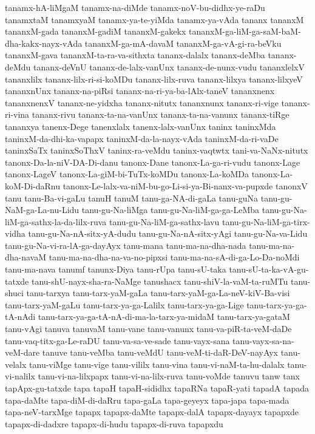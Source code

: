 {tanamx-hA-liMgaM
tanamx-na-diMde
tanamx-noV-bu-didhx-ye-raDu
tanamxtaM
tanamxyaM
tanamx-ya-te-yiMda
tanamx-ya-vAda
tananx
tananxM
tananxM-gada
tananxM-gadiM
tananxM-gakekx
tananxM-ga-liM-ga-saM-baM-dha-kakx-nayx-vAda
tananxM-ga-mA-davaM
tananxM-ga-vA-gi-ra-beVku
tananxM-gava
tananxM-ta-ra-va-sithxta
tananx-dalalx
tananx-deMba
tananx-deMdu
tananx-deVnU
tananx-de-lalx-vanUnx
tananx-de-nunx-vudu
tananxlelxV
tananxlilx
tananx-lilx-ri-si-koMDu
tananx-lilx-ruva
tananx-lilxya
tananx-lilxyeV
tananxnUnx
tananx-na-piRsi
tananx-na-ri-ya-ba-lAlx-taneV
tananxnenx
tananxnenxV
tananx-ne-yidxha
tananx-nitutx
tananxnunx
tananx-ri-vige
tananx-ri-vina
tananx-rivu
tananx-ta-na-vanUnx
tananx-ta-na-vanunx
tananx-tiRge
tananxya
tanenx-Dege
tanenxlalx
tanenx-lalx-vanUnx
taninx
taninxMda
taninxM-da-dhi-ka-vapapx
taninxM-da-la-nayx-vAda
taninxM-da-ri-vaDe
taninxSaTx
taninxSoThxV
taninx-ra-veMdu
taninx-vaqtwtx
tani-va-NaNx-nitutx
tanonx-Da-la-niV-DA-Di-danu
tanonx-Dane
tanonx-La-ga-ri-vudu
tanonx-Lage
tanonx-LageV
tanonx-La-giM-bi-TuTx-koMDu
tanonx-La-koMDa
tanonx-La-koM-Di-daRnu
tanonx-Le-lalx-va-niM-bu-go-Li-si-ya-Bi-nanx-va-pupxde
tanonxV
tanu
tanu-Ba-vi-gaLu
tanuH
tanuM
tanu-ga-NA-di-gaLa
tanu-guNa
tanu-gu-NaM-ga-La-nu-Lidu
tanu-gu-Na-liMga
tanu-gu-Na-liM-ga-ga-LeMba
tanu-gu-Na-liM-ga-sathx-la-da-lilx-ruva
tanu-gu-Na-liM-ga-sathx-lavu
tanu-gu-Na-liM-ga-tirx-vidha
tanu-gu-Na-nA-sitx-yA-dudu
tanu-gu-Na-nA-sitx-yAgi
tanu-gu-Na-va-Lidu
tanu-gu-Na-vi-ra-lA-ga-dayAyx
tanu-mana
tanu-ma-na-dha-nada
tanu-ma-na-dha-navaM
tanu-ma-na-dha-na-va-no-pipxsi
tanu-ma-na-sA-di-ga-Lo-Da-noMdi
tanu-ma-nava
tanumf
tanunx-Diya
tanu-rUpa
tanu-sU-taka
tanu-sU-ta-ka-vA-gu-tatxde
tanu-shU-nayx-sha-ra-NaMge
tanushacx
tanu-shiV-la-vaM-ta-ruMTu
tanu-shuci
tanu-tarxya
tanu-tarx-yaM-gaLa
tanu-tarx-yaM-ga-La-neV-kiV-Ba-visi
tanu-tarx-yaM-gaLu
tanu-tarx-ya-ga-Lalilx
tanu-tarx-ya-ga-Lige
tanu-tarx-ya-ga-tA-nAdi
tanu-tarx-ya-ga-tA-nA-di-ma-la-tarx-ya-midaM
tanu-tarx-ya-gataM
tanu-vAgi
tanuva
tanuvaM
tanu-vane
tanu-vanunx
tanu-va-piR-ta-veM-daDe
tanu-vaq-titx-ga-Le-raDU
tanu-va-sa-ve-sade
tanu-vayx-sana
tanu-vayx-sa-na-veM-dare
tanuve
tanu-veMba
tanu-veMdU
tanu-veM-ti-daR-DeV-nayAyx
tanu-velalx
tanu-viMge
tanu-vige
tanu-vililx
tanu-vina
tanu-vi-naM-ta-hu-dalalx
tanu-vi-nalilx
tanu-vi-na-lilxpapx
tanu-vi-na-lilx-ruva
tanu-voMde
tanuvu
tanw
tanx
tapApx-gu-tatxde
tapa
tapaH
tapaH-sididhx
tapaRNa
tapaR-yati
tapadA
tapada
tapa-daMte
tapa-diM-di-daRru
tapa-gaLa
tapa-geyeyx
tapa-japa
tapa-mada
tapa-neV-tarxMge
tapapx
tapapx-daMte
tapapx-dalA
tapapx-dayayx
tapapxde
tapapx-di-dadxre
tapapx-di-hudu
tapapx-di-ruva
tapapxdu
}
